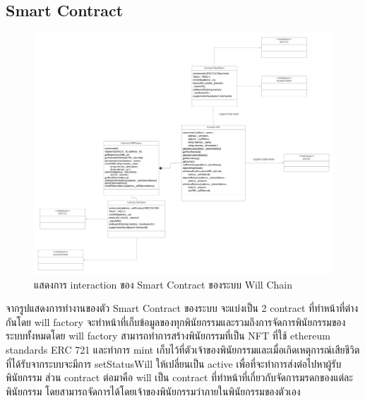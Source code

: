 \documentclass[12pt,oneside,openright,a4paper]{cpe-thai-project}
\begin{document}
\subsection{Smart Contract}
	\begin{figure}[!thb]	
		\centering
		\includegraphics[scale=0.3]{smartContractDiagram}
		\caption{แสดงการ interaction ของ Smart Contract ของระบบ Will Chain}
	\end{figure}
	\FloatBarrier
\tab จากรูปแสดงการทำงานของตัว Smart Contract ของระบบ จะแบ่งเป็น 2 contract ที่ทำหน้าที่ต่างกันโดย will factory จะทำหน้าที่เก็บข้อมูลของทุกพินัยกรรมและรวมถึงการจัดการพินัยกรรมของระบบทั้งหมดโดย will factory สามารถทำการสร้างพินัยกรรมที่เป็น NFT ที่ใช้ ethereum standards ERC 721 และทำการ mint เก็บไว้ที่ตัวเจ้าของพินัยกรรมและเมื่อเกิดเหตุการณ์เสียชีวิตที่ได้รับจากระบบจะมีการ setStatusWill ให้เปลี่ยนเป็น active เพื่อที่จะทำการส่งต่อไปหาผู้รับพินัยกรรม ส่วน contract ต่อมาคือ will เป็น contract ที่ทำหน้าที่เกี่ยวกับจัดการมรดกของแต่ละพินัยกรรม โดยสามารถจัดการได้โดยเจ้าของพินัยกรรมว่าภายในพินัยกรรมของตัวเอง
\clearpage
\end{document}
